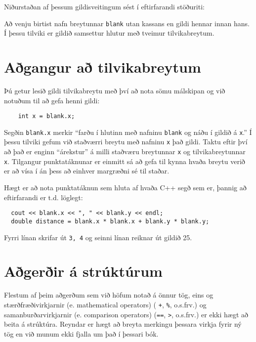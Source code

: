 
Niðurstaðan af þessum gildisveitingum sést í eftirfarandi stöðuriti:

\vspace{0.1in}
\centerline{}
\vspace{0.1in}

Að venju birtist nafn breytunnar {\tt blank} utan kassans en gildi hennar innan hans.
Í þessu tilviki er gildið samsettur hlutur með tveimur tilvikabreytum.

\section{Aðgangur að tilvikabreytum}

Þú getur lesið gildi tilvikabreytu með því að nota sömu málskipan og við notuðum til að gefa henni gildi:

\begin{verbatim}
    int x = blank.x;
\end{verbatim}
%
Segðin {\tt blank.x} merkir ``farðu í hlutinn með nafninu {\tt blank} og náðu í gildið á {\tt x}.''
Í þessu tilviki gefum við staðværri breytu með nafninu {\tt x} það gildi.
Taktu eftir því að það er enginn ``árekstur'' á milli staðværu breytunnar {\tt x} og tilvikabreytunnar {\tt x}.
Tilgangur punktatáknunar er einmitt sá að gefa til kynna hvaða breytu verið er að vísa í án þess að einhver margræðni sé til staðar.

Hægt er að nota punktatáknun sem hluta af hvaða C++ segð sem er, þannig að eftirfarandi er t.d. löglegt:

\begin{verbatim}
  cout << blank.x << ", " << blank.y << endl;
  double distance = blank.x * blank.x + blank.y * blank.y;
\end{verbatim}
%
Fyrri línan skrifar út {\tt 3, 4} og seinni línan reiknar út gildið 25.

\section{Aðgerðir á strúktúrum}

Flestum af þeim aðgerðum sem við höfum notað á önnur tög, eins og stærðfræðivirkjarnir (e. mathematical operators) ( {\tt +}, {\tt \%}, o.s.frv.)
og samanburðarvirkjarnir (e. comparison operators) ({\tt ==}, {\tt >}, o.s.frv.) er ekki hægt að beita á strúktúra.
Reyndar er hægt að breyta merkingu þessara virkja fyrir ný tög en við munum ekki fjalla um það í þessari bók.


